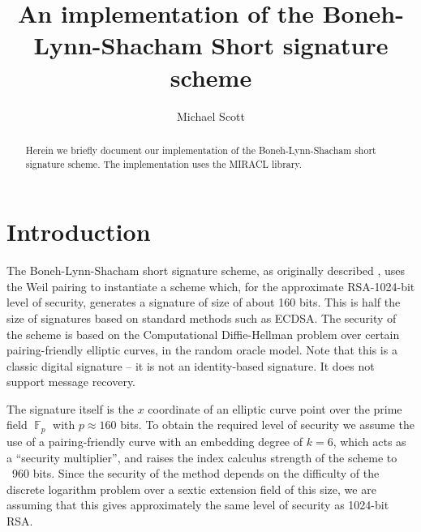\documentclass{llncs}
\newcommand{\F}{\mathop{\mathbb{F}}}
\begin{document}
\pagestyle{plain}

\title{An implementation of the Boneh-Lynn-Shacham Short signature scheme}

\author{%
Michael Scott
}

\maketitle

\begin{abstract}

Herein we briefly document our implementation of the Boneh-Lynn-Shacham \cite{boneh-lynn-shacham} short signature 
scheme. The implementation uses the MIRACL library.

\end{abstract}

\section{Introduction}\label{sec:intro}

The Boneh-Lynn-Shacham short signature scheme, as originally described \cite{boneh-lynn-shacham}, uses the Weil 
pairing to instantiate a scheme which, for the approximate RSA-1024-bit level of security, generates a signature 
of size of about 160 bits. This is half the size of signatures based on standard methods such as ECDSA. The security of
the scheme is based on the Computational Diffie-Hellman problem over certain pairing-friendly elliptic curves, in
the random oracle model. Note that this is a classic digital signature -- it is not an identity-based signature.
It does not support message recovery.

The signature itself is the $x$ coordinate of an elliptic curve point over the prime field $\F_p$ with $p\approx 160$ bits. 
To obtain the required level of security we assume the use of a pairing-friendly curve with an embedding degree 
of $k=6$, which acts as a ``security multiplier'', and raises the index calculus strength of the scheme to ~960 bits.
Since the security of the method depends on the difficulty of the discrete logarithm problem over a sextic extension
field of this size, we are assuming that this gives approximately the same level of security as 1024-bit RSA.
\end{document}
